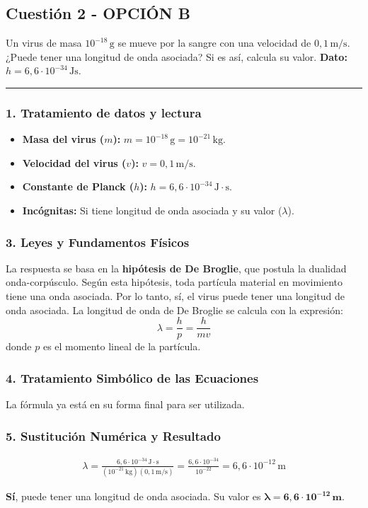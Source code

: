 \newpage

\subsection{Cuestión 2 - OPCIÓN B}
\label{subsec:5B_2008_jun_ord}
\begin{cajaenunciado}
Un virus de masa $10^{-18}\,\text{g}$ se mueve por la sangre con una velocidad de $0,1\,\text{m/s}$. ¿Puede tener una longitud de onda asociada? Si es así, calcula su valor.
\textbf{Dato:} $h=6,6\cdot10^{-34}\,\text{Js}$.
\end{cajaenunciado}
\hrule

\subsubsection*{1. Tratamiento de datos y lectura}
\begin{itemize}
    \item \textbf{Masa del virus ($m$):} $m = 10^{-18}\,\text{g} = 10^{-21}\,\text{kg}$.
    \item \textbf{Velocidad del virus ($v$):} $v=0,1\,\text{m/s}$.
    \item \textbf{Constante de Planck ($h$):} $h=6,6\cdot10^{-34}\,\text{J}\cdot\text{s}$.
    \item \textbf{Incógnitas:} Si tiene longitud de onda asociada y su valor ($\lambda$).
\end{itemize}

\subsubsection*{3. Leyes y Fundamentos Físicos}
La respuesta se basa en la \textbf{hipótesis de De Broglie}, que postula la dualidad onda-corpúsculo. Según esta hipótesis, toda partícula material en movimiento tiene una onda asociada. Por lo tanto, sí, el virus puede tener una longitud de onda asociada.
La longitud de onda de De Broglie se calcula con la expresión:
$$ \lambda = \frac{h}{p} = \frac{h}{mv} $$
donde $p$ es el momento lineal de la partícula.

\subsubsection*{4. Tratamiento Simbólico de las Ecuaciones}
La fórmula ya está en su forma final para ser utilizada.

\subsubsection*{5. Sustitución Numérica y Resultado}
\begin{gather}
    \lambda = \frac{6,6\cdot10^{-34}\,\text{J}\cdot\text{s}}{(10^{-21}\,\text{kg})(0,1\,\text{m/s})} = \frac{6,6\cdot10^{-34}}{10^{-22}} = 6,6 \cdot 10^{-12} \, \text{m}
\end{gather}
\begin{cajaresultado}
\textbf{Sí}, puede tener una longitud de onda asociada. Su valor es $\boldsymbol{\lambda = 6,6 \cdot 10^{-12} \, \textbf{m}}$.
\end{cajaresultado}

